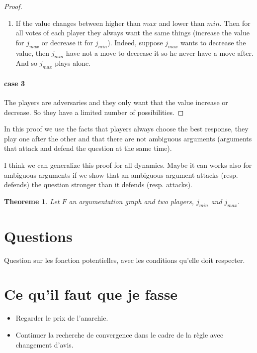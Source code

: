 \documentclass[12pt]{article}
\newtheorem{theoreme}{Theoreme}[section]
\theoremstyle{defi}
\theoremstyle{not}
\theoremstyle{prob}
\begin{document}
\begin{proof}
\begin{enumerate}
          \item If the value changes between higher than $max$ and lower than $min$. Then for all votes of each player they always want the same things (increase the value for $j_{max}$ or decrease it for $j_{min}$). Indeed, suppose $j_{max}$ wants to decrease the value, then $j_{min}$ have not a move to decrease it so he never have a move after. And so $j_{max}$ plays alone.
        \end{enumerate}

        \paragraph{case 3}
          The players are adversaries and they only want that the value increase or decrease. So they have a limited number of possibilities.
      \end{proof}

      In this proof we use the facts that players always choose the best response, they play one after the other and that there are not ambiguous arguments (arguments that attack and defend the question at the same time).

      I think we can generalize this proof for all dynamics. Maybe it can works also for ambiguous arguments if we show that an ambiguous argument attacks (resp. defends) the question stronger than it defends (resp. attacks).



      \begin{theoreme}
        Let $F$ an argumentation graph and two players, $j_{min}$ and $j_{max}$. 
      \end{theoreme}
\color{black}
  \section{Questions}
  \color{blue}
  Question sur les fonction potentielles, avec les conditions qu'elle doit respecter.
\color{black}
  \section{Ce qu'il faut que je fasse}

    \begin{itemize}
      \item Regarder le prix de l'anarchie.
      \item Continuer la recherche de convergence dans le cadre de la règle avec changement d'avis.
    \end{itemize}
\end{document}
